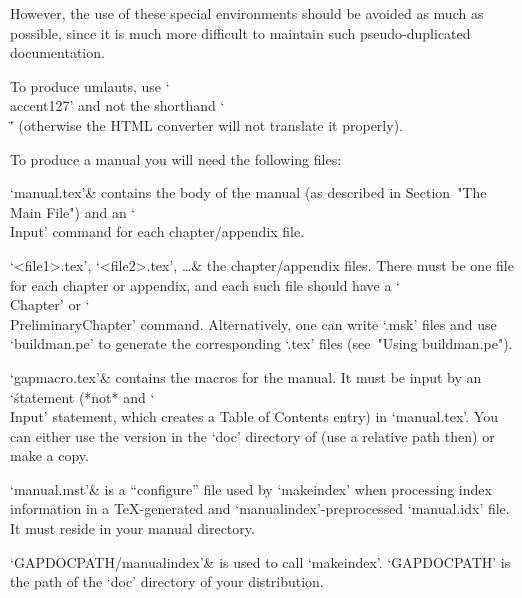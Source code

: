 However, the use of these special environments should be avoided as  much
as  possible,  since  it  is  much  more  difficult  to   maintain   such
pseudo-duplicated documentation.


To produce umlauts,  use  `\\accent127'  and  not  the  shorthand  `\\\"'
(otherwise the HTML converter will not translate it properly).


To produce a manual you will need the following files:

\beginitems
`manual.tex'&
    contains the body of the manual
    (as described in Section~"The Main File")
    and an `\\Input' command for each chapter/appendix file.

`<file1>.tex', `<file2>.tex', \dots &
    the chapter/appendix files. There must be one file for each chapter
    or appendix, and each such file should have a `\\Chapter' or
    `\\PreliminaryChapter' command. Alternatively, one can write
    `.msk' files and use `buildman.pe' to generate the corresponding
    `.tex' files (see~"Using buildman.pe").

`gapmacro.tex'&
    contains the macros for the manual.
    It must be input by an `\' statement (*not* and `\\Input'
    statement, which creates a Table of Contents entry) in `manual.tex'.
    You can either use the version in the `doc' directory of {\GAP}
    (use a relative path then) or make a copy.

`manual.mst'&
    is a ``configure'' file used by `makeindex' when processing
    index information in a {\TeX}-generated and `manualindex'-preprocessed
    `manual.idx' file.
    It must reside in your manual directory.

`GAPDOCPATH/manualindex'&
    is used to call `makeindex'.
    `GAPDOCPATH' is the path of the `doc' directory of your {\GAP}
    distribution.
\enditems

